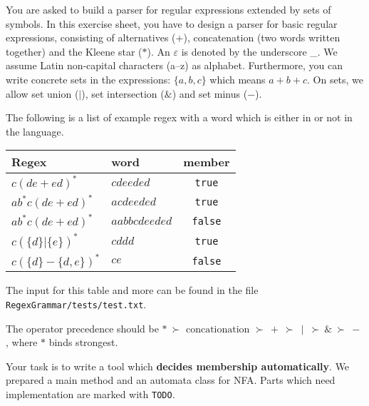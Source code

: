 \documentclass[a4paper]{article}
\begin{document}
\begin{exercise}{20}
	You are asked to build a parser for regular expressions extended by sets of symbols. In this exercise sheet, you have to design a parser for basic regular expressions, consisting of alternatives ($+$), concatenation (two words written together) and the Kleene star ($*$). An $\varepsilon$ is denoted by the underscore \_.
	We assume Latin non-capital characters (a--z) as alphabet.
	Furthermore, you can write concrete sets in the expressions: $\{ a, b, c \}$ which means $a + b + c$. On sets, we allow set union ($\mid$), set intersection ($\&$) and set minus ($-$).

	The following is a list of example regex with a word which is either in or not in the language.

    \begin{center}
        \begin{tabular}{l|l|c}
         Regex & word & member \\
          \hline
         $c(de+ed)^*$ & $cdeeded$ & \texttt{true} \\
         $ab^{*}c(de+ed)^*$ & $acdeeded$ & \texttt{true} \\
         $ab^{*}c(de+ed)^*$ & $aabbcdeeded$ & \texttt{false} \\
         $c(\{d\}|\{e\})^*$ & $cddd$ & \texttt{true} \\
         $c(\{d\} - \{d,e\})^*$ & $ce$ & \texttt{false}
        \end{tabular}
    \end{center}

	The input for this table and more can be found in the file \texttt{RegexGrammar/tests/test.txt}.
	
	The operator precedence should be $*~\succ \text{ concationation } \succ ~+~ \succ ~\mid~ \succ ~\&~  \succ ~- $, where $*$ binds strongest.

	Your task is to write a tool which \textbf{decides membership automatically}. We prepared a main method and an automata class for NFA. Parts which need implementation are marked with \texttt{TODO}.


\end{exercise}
\end{document}
